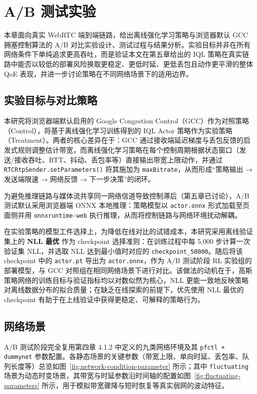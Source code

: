 \chapter{A/B 测试实验}
\label{chap:ab-test}

本章面向真实 WebRTC 端到端链路，给出离线强化学习策略与浏览器默认 GCC 拥塞控制算法的 A/B 对比实验设计、测试过程与结果分析。实验目标并非在所有网络条件下单纯追求更高吞吐，而是验证本文在第五章给出的 IQL 策略在真实链路中能否以较低的部署风险换取更稳定、更低时延、更低丢包且动作更平滑的整体 QoE 表现，并进一步讨论策略在不同网络场景下的适用边界。

\section{实验目标与对比策略}

本研究将浏览器端默认启用的 Google Congestion Control（GCC）作为对照策略（Control），将基于离线强化学习训练得到的 IQL Actor 策略作为实验策略（Treatment）。两者的核心差异在于：GCC 通过接收端延迟梯度与丢包反馈的启发式规则调整估计带宽，而离线强化学习策略在每个控制周期根据状态窗口（发送/接收吞吐、RTT、抖动、丢包率等）直接输出带宽上限动作，并通过 \texttt{RTCRtpSender.setParameters()} 将其施加为 \texttt{maxBitrate}，从而形成“策略输出 → 发送端限速 → 网络反馈 → 下一步决策”的闭环。

为避免推理链路与媒体流共享同一网络信道导致控制滞后（第五章已讨论），A/B 测试默认采用浏览器端 ONNX 本地推理：策略模型以 \texttt{actor.onnx} 形式加载至页面侧并用 \texttt{onnxruntime-web} 执行推理，从而将控制链路与网络环境扰动解耦。

在实验策略的模型工件选择上，为降低在线对比的试错成本，本研究采用离线验证集上的 \textbf{NLL 最优} 作为 checkpoint 选择准则：在训练过程中每 5,000 步计算一次验证集 NLL，并选取 NLL 达到最小值时对应的 \texttt{checkpoint\_50000}。随后将该 checkpoint 中的 \texttt{actor.pt} 导出为 \texttt{actor.onnx}，作为 A/B 测试阶段 RL 实验组的部署模型，与 GCC 对照组在相同网络场景下进行对比。该做法的动机在于，高斯策略网络的训练目标与验证指标均以对数似然为核心，NLL 更能一致地反映策略对离线数据分布的拟合质量；在缺乏在线探索的前提下，优先使用 NLL 最优的 checkpoint 有助于在上线验证中获得更稳定、可解释的策略行为。

\section{网络场景}

A/B 测试阶段完全复用第四章 4.1.2 中定义的九类网络环境及其 \texttt{pfctl + dummynet} 参数配置。各静态场景的关键参数（带宽上限、单向时延、丢包率、队列长度等）总览如图~\ref{fig:network-condition-parameter} 所示；其中 \texttt{fluctuating} 场景为动态时变场景，其带宽与时延参数沿时间轴的配置如图~\ref{fig:fluctuating-parameters} 所示，用于模拟带宽骤降与短时恢复等真实弱网的波动特征。


